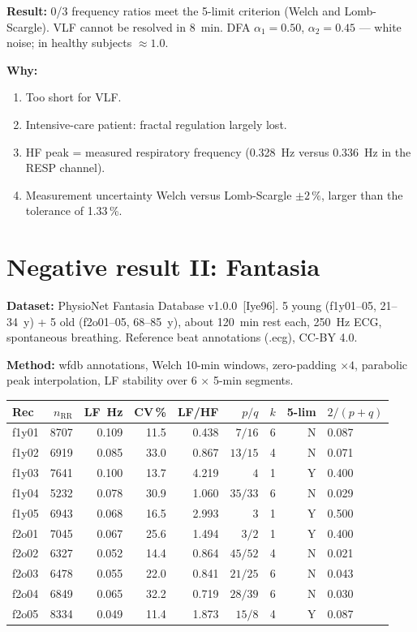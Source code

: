 \textbf{Result:} 0/3 frequency ratios meet the 5-limit criterion (Welch
and Lomb-Scargle). VLF cannot be resolved in 8~min. DFA $\alpha_1=0.50$,
$\alpha_2=0.45$ --- white noise; in healthy subjects $\approx1.0$.

\textbf{Why:}
\begin{enumerate}
\item Too short for VLF.
\item Intensive-care patient: fractal regulation largely lost.
\item HF peak = measured respiratory frequency (0.328~Hz versus 0.336~Hz in
  the RESP channel).
\item Measurement uncertainty Welch versus Lomb-Scargle $\pm2\,\%$, larger
  than the tolerance of 1.33\,\%.
\end{enumerate}

\section{Negative result II: Fantasia}

\textbf{Dataset:} PhysioNet Fantasia Database v1.0.0
\LM\,[Iye96]. 5 young (f1y01--05, 21--34~y) + 5 old
(f2o01--05, 68--85~y), about 120~min rest each, 250~Hz ECG,
spontaneous breathing. Reference beat annotations (.ecg), CC-BY 4.0.

\textbf{Method:} wfdb annotations, Welch 10-min windows,
zero-padding $\times4$, parabolic peak interpolation,
LF stability over 6 $\times$ 5-min segments.

\begin{center}
\begin{tabular}{@{}lrrrrrrrl@{}}
\toprule
Rec & $n_\text{RR}$ & LF~Hz & CV\,\% & LF/HF & $p/q$ & $k$ & 5-lim & $2/(p+q)$ \\
\midrule
f1y01 & 8707 & 0.109 & 11.5 & 0.438 & $7/16$ & 6 & N & 0.087 \\
f1y02 & 6919 & 0.085 & 33.0 & 0.867 & $13/15$ & 4 & N & 0.071 \\
f1y03 & 7641 & 0.100 & 13.7 & 4.219 & $4$ & 1 & Y & 0.400 \\
f1y04 & 5232 & 0.078 & 30.9 & 1.060 & $35/33$ & 6 & N & 0.029 \\
f1y05 & 6943 & 0.068 & 16.5 & 2.993 & $3$ & 1 & Y & 0.500 \\
\midrule
f2o01 & 7045 & 0.067 & 25.6 & 1.494 & $3/2$ & 1 & Y & 0.400 \\
f2o02 & 6327 & 0.052 & 14.4 & 0.864 & $45/52$ & 4 & N & 0.021 \\
f2o03 & 6478 & 0.055 & 22.0 & 0.841 & $21/25$ & 6 & N & 0.043 \\
f2o04 & 6849 & 0.065 & 32.2 & 0.719 & $28/39$ & 6 & N & 0.030 \\
f2o05 & 8334 & 0.049 & 11.4 & 1.873 & $15/8$ & 4 & Y & 0.087 \\
\bottomrule
\end{tabular}
\end{center}

